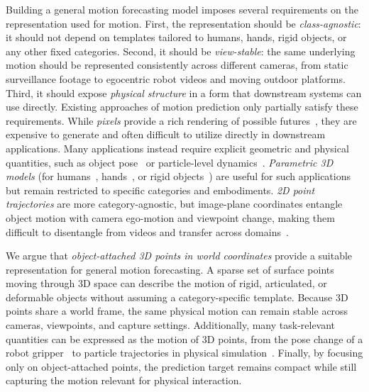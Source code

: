 Building a general motion forecasting model imposes several requirements on the representation used for motion. First, the representation should be \textit{class-agnostic}: it should not depend on templates tailored to humans, hands, rigid objects, or any other fixed categories. Second, it should be \textit{view-stable}: the same underlying motion should be represented consistently across different cameras, from static surveillance footage to egocentric robot videos and moving outdoor platforms. Third, it should expose \textit{physical structure} in a form that downstream systems can use directly. 
Existing approaches of motion prediction only partially satisfy these requirements. While \textit{pixels} provide a rich rendering of possible futures~\cite{wan22, nvidia2025cosmos, bruce2024genie}, they are expensive to generate and often difficult to utilize directly in downstream applications.
Many applications instead require explicit geometric and physical quantities, such as object pose~\cite{traj2action, wen2023bundlesdf, vidbot} or particle-level dynamics~\cite{li2018particledynamics, sanchez2020graphnetworksimulators}.
\textit{Parametric 3D models} (for humans~\cite{chen2023humanmac}, hands~\cite{bi2025hrdthumanmanipulationenhanced}, or rigid objects~\cite{soraki2026objectforesightpredictingfuture3d}) are useful for such applications but remain restricted to specific categories and embodiments. 
\textit{2D point trajectories} are more category-agnostic, but image-plane coordinates entangle object motion with camera ego-motion and viewpoint change, making them difficult to disentangle from videos and transfer across domains~\cite{track2act, thakkar2026forecastingmotion}. 

We argue that \textit{object-attached 3D points in world coordinates} provide a suitable representation for general motion forecasting. A sparse set of surface points moving through 3D space can describe the motion of rigid, articulated, or deformable objects without assuming a category-specific template. Because 3D points share a world frame, the same physical motion can remain stable across cameras, viewpoints, and capture settings. Additionally, many task-relevant quantities can be expressed as the motion of 3D points, from the pose change of a robot gripper~\cite{vidbot} to particle trajectories in physical simulation~\cite{li2018particledynamics, sanchez2020graphnetworksimulators}. 
Finally, by focusing only on object-attached points, the prediction target remains compact while still capturing the motion relevant for physical interaction.

